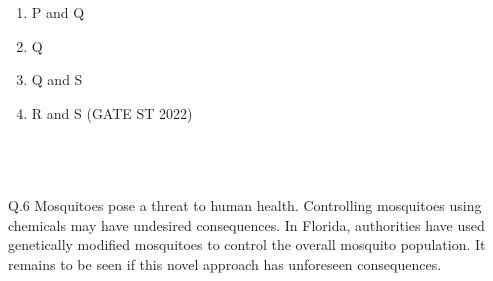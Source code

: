 \documentclass[journal,12pt,onecolumn]{IEEEtran}
\theoremstyle{remark}
\begin{document}
\begin{enumerate}
\item P and Q
\item Q
\item Q and S
\item R and S
\hfill (GATE ST 2022)
\end{enumerate}
	 \pagebreak
	 \\
	 \\
	 \\
Q.6 Mosquitoes pose a threat to human health. Controlling mosquitoes using chemicals may have undesired consequences. In Florida, authorities have used genetically modified mosquitoes to control the overall mosquito population. It remains to be seen if this novel approach has unforeseen consequences.
	
\end{document}
